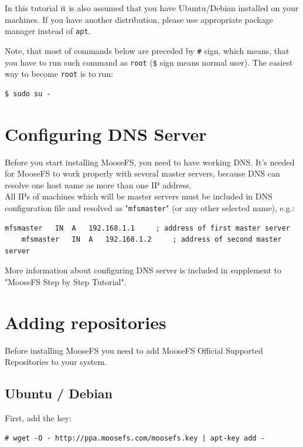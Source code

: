 \documentclass[a4paper,11pt,english]{report}
\def\code#1{\texttt{#1}}
\begin{document}
	\bigskip
	In this tutorial it is also assumed that you have Ubuntu/Debian installed on your machines. If you have another distribution, please use appropriate package manager instead of \code{apt}.	
	
	Note, that most of commands below are preceded by \code{\#} sign, which means, that you have to run such command as \code{root} (\code{\$} sign means normal user). The easiest way to become \code{root} is to run:
		
	\begin{lstlisting}[caption={Becoming \code{root}}]
	$ sudo su -
	\end{lstlisting}
		
		
		\section{Configuring DNS Server}
		Before you start installing MooseFS, you need to have working DNS. It's needed for MooseFS to work properly with several master servers, because DNS can resolve one host name as more than one IP address. \\
		All IPs of machines which will be master servers must be included in DNS configuration file and resolved as "\code{mfsmaster}" (or any other selected name), e.g.:

		\begin{lstlisting}[caption={DNS entries}]
	mfsmaster	IN	A	192.168.1.1		; address of first master server
	mfsmaster	IN	A	192.168.1.2		; address of second master server
		\end{lstlisting}
		
More information about configuring DNS server is included in supplement to "MooseFS Step by Step Tutorial".
		
		\section{Adding repositories}
		Before installing MooseFS you need to add MooseFS Official Supported Repositories to your system.
			\subsection{Ubuntu / Debian}
			First, add the key:
			\begin{lstlisting}[caption={Adding the repo key}]
	# wget -O - http://ppa.moosefs.com/moosefs.key | apt-key add -
			\end{lstlisting}
			
\end{document}
